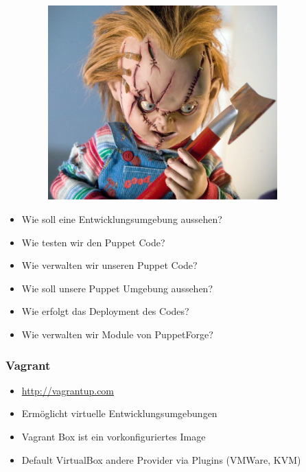 \documentclass{beamer}
\begin{document}
\begin{frame}
\end{frame}

\begin{frame}
  \begin{figure}[ht]
    \centering
      \includegraphics[height=7.5cm,width=10cm]{../pics/chucky.png}
    \label{fig:stack}
  \end{figure}
\end{frame}


\begin{frame}
  \begin{itemize}
  \item Wie soll eine Entwicklungsumgebung aussehen?
  \item Wie testen wir den Puppet Code?
  \item Wie verwalten wir unseren Puppet Code?
  \item Wie soll unsere Puppet Umgebung aussehen?
  \item Wie erfolgt das Deployment des Codes?
  \item Wie verwalten wir Module von PuppetForge?
  \end{itemize}
\end{frame}

\begin{frame}
\end{frame}

\begin{frame}
  \frametitle{Vagrant}

  \begin{itemize}
  \item \url{http://vagrantup.com}
  \item Ermöglicht virtuelle Entwicklungsumgebungen
  \item Vagrant Box ist ein vorkonfiguriertes Image
  \item Default VirtualBox andere Provider via Plugins (VMWare, KVM)
  \end{itemize}
\end{frame}
\end{document}
